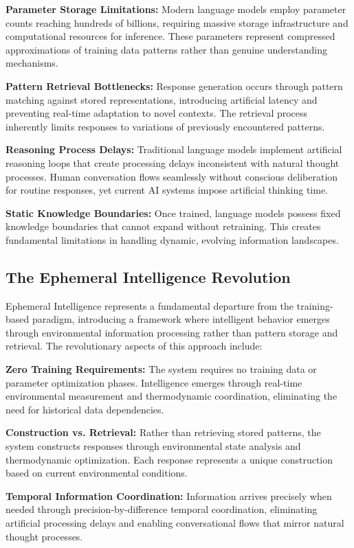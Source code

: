 \documentclass[12pt,a4paper]{article}
\begin{document}
\textbf{Parameter Storage Limitations:} Modern language models employ parameter counts reaching hundreds of billions, requiring massive storage infrastructure and computational resources for inference. These parameters represent compressed approximations of training data patterns rather than genuine understanding mechanisms.

\textbf{Pattern Retrieval Bottlenecks:} Response generation occurs through pattern matching against stored representations, introducing artificial latency and preventing real-time adaptation to novel contexts. The retrieval process inherently limits responses to variations of previously encountered patterns.

\textbf{Reasoning Process Delays:} Traditional language models implement artificial reasoning loops that create processing delays inconsistent with natural thought processes. Human conversation flows seamlessly without conscious deliberation for routine responses, yet current AI systems impose artificial thinking time.

\textbf{Static Knowledge Boundaries:} Once trained, language models possess fixed knowledge boundaries that cannot expand without retraining. This creates fundamental limitations in handling dynamic, evolving information landscapes.

\subsection{The Ephemeral Intelligence Revolution}

Ephemeral Intelligence represents a fundamental departure from the training-based paradigm, introducing a framework where intelligent behavior emerges through environmental information processing rather than pattern storage and retrieval. The revolutionary aspects of this approach include:

\textbf{Zero Training Requirements:} The system requires no training data or parameter optimization phases. Intelligence emerges through real-time environmental measurement and thermodynamic coordination, eliminating the need for historical data dependencies.

\textbf{Construction vs. Retrieval:} Rather than retrieving stored patterns, the system constructs responses through environmental state analysis and thermodynamic optimization. Each response represents a unique construction based on current environmental conditions.

\textbf{Temporal Information Coordination:} Information arrives precisely when needed through precision-by-difference temporal coordination, eliminating artificial processing delays and enabling conversational flows that mirror natural thought processes.
\end{document}
